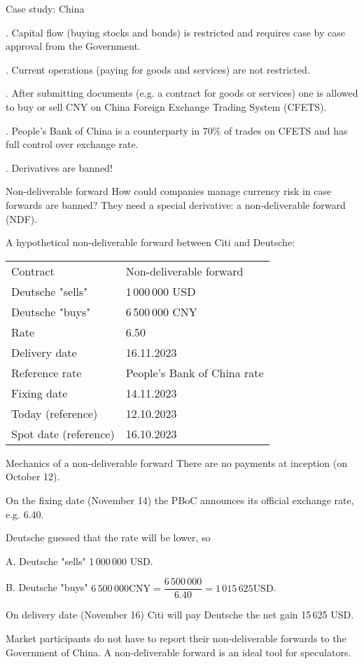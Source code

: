 \documentclass{beamer}
\begin{document}
\begin{frame}{Case study: China}

. Capital flow (buying stocks and bonds) is restricted and requires case by case approval from the Government.

. Current operations (paying for goods and services) are not restricted.

. After submitting documents (e.g. a contract for goods or services) one is allowed to buy or sell CNY on  China Foreign Exchange Trading System (CFETS).

. People's Bank of China is a counterparty in 70\% of trades on CFETS and has full control over exchange rate.

. Derivatives are banned!

\end{frame}



\begin{frame}{Non-deliverable forward}
\justify
How could companies manage currency risk in case forwards are banned? They need a special derivative: a \alert{non-deliverable forward (NDF)}.

\justify
A hypothetical non-deliverable forward between Citi and Deutsche:

\justify
\centering
\begin{tabular}{l|l}
	Contract & Non-deliverable forward		\\
	Deutsche "sells"  & 1\,000\,000 USD	\\
	Deutsche "buys" & 6\,500\,000 CNY		\\
	Rate		 		      & 6.50 						\\
	Delivery date	   & 16.11.2023 \\
	Reference rate	   & People's Bank of China rate	\\
	Fixing date		   & 14.11.2023 \\
	Today (reference)	& 12.10.2023 \\
	Spot date (reference) & 16.10.2023
\end{tabular}
\end{frame}



\begin{frame}{Mechanics of a non-deliverable forward}
\justify
There are no payments at inception (on October 12).

\justify
On the fixing date (November 14) the PBoC announces its official exchange rate, e.g. 6.40.

\justify
Deutsche guessed that the rate will be lower, so

A. Deutsche "sells" 1\,000\,000 USD.

B. Deutsche "buys" $6\,500\,000 \text{CNY} = \dfrac{6\,500\,000}{6.40} = 1\,015\,625 \text{USD}$.

\justify
On delivery date (November 16) Citi will pay Deutsche the net gain 15\,625 USD.

\justify
Market participants do not have to report their non-deliverable forwards to the Government of China. A non-deliverable forward is an ideal tool for speculators.
\end{frame}
\end{document}

